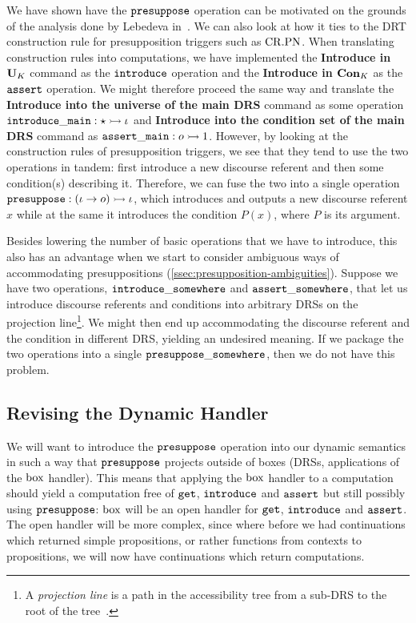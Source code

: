We have shown have the $\mathtt{presuppose}$ operation can be motivated on the
grounds of the analysis done by Lebedeva
in~\cite{lebedeva2012expression}. We can also look at how it ties to the
DRT construction rule for presupposition triggers such as $\mathrm{CR.PN}$. When
translating construction rules into computations, we have implemented the
\textbf{Introduce in $\mathbf{U}_K$} command as the $\mathtt{introduce}$
operation and the \textbf{Introduce in $\mathbf{Con}_K$} as the
$\mathtt{assert}$ operation. We might therefore proceed the same way and
translate the \textbf{Introduce into the universe of the main DRS} command
as some operation $\mathtt{introduce\_main} : \star \rightarrowtail \iota$ and
\textbf{Introduce into the condition set of the main DRS} command as
$\mathtt{assert\_main} : o \rightarrowtail 1$. However, by looking at the construction
rules of presupposition triggers, we see that they tend to use the two
operations in tandem: first introduce a new discourse referent and then
some condition(s) describing it. Therefore, we can fuse the two into a
single operation $\mathtt{presuppose} : (\iota \to o) \rightarrowtail \iota$, which
introduces and outputs a new discourse referent $x$ while at the same it
introduces the condition $P(x)$, where $P$ is its argument.

Besides lowering the number of basic operations that we have to introduce,
this also has an advantage when we start to consider ambiguous ways of
accommodating presuppositions
(\ref{ssec:presupposition-ambiguities}). Suppose we have two operations,
$\mathtt{introduce\_somewhere}$ and $\mathtt{assert\_somewhere}$, that let us
introduce discourse referents and conditions into arbitrary DRSs on the
projection line\footnote{A \emph{projection line} is a path in the
  accessibility tree from a sub-DRS to the root of the
  tree~\cite{van1992presupposition}.}. We might then end up accommodating
the discourse referent and the condition in different DRS, yielding an
undesired meaning. If we package the two operations into a single
$\mathtt{presuppose\_somewhere}$, then we do not have this problem.


\subsection{Revising the Dynamic Handler}
\label{ssec:revising-dynamic-handler}

We will want to introduce the $\mathtt{presuppose}$ operation into our dynamic
semantics in such a way that $\mathtt{presuppose}$ projects outside of boxes
(DRSs, applications of the $\mathrm{box}$ handler). This means that applying the
$\mathrm{box}$ handler to a computation should yield a computation free of
$\mathtt{get}$, $\mathtt{introduce}$ and $\mathtt{assert}$ but still possibly using
$\mathtt{presuppose}$: $\mathrm{box}$ will be an open handler for $\mathtt{get}$,
$\mathtt{introduce}$ and $\mathtt{assert}$. The open handler will be more complex,
since where before we had continuations which returned simple propositions,
or rather functions from contexts to propositions, we will now have
continuations which return computations.

